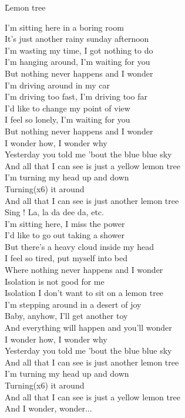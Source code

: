 \documentclass{novel}
\begin{document}
\newpage
\small
\h*{Lemon tree}

I'm sitting here in a boring room \\
It's just another rainy sunday afternoon \\
I'm wasting my time, I got nothing to do \\
I'm hanging around, I'm waiting for you \\
But nothing never happens and I wonder \\
I'm driving around in my car \\
I'm driving too fast, I'm driving too far \\
I'd like to change my point of view \\
I feel so lonely, I'm waiting for you \\
But nothing never happens and I wonder \\

I wonder how, I wonder why \\
Yesterday you told me 'bout the blue blue sky \\
And all that I can see is just a yellow lemon tree \\
I'm turning my head up and down \\
Turning(x6) it around \\
And all that I can see is just another lemon tree \\
Sing ! La, la da dee da, etc. \\

I'm sitting here, I miss the power \\
I'd like to go out taking a shower \\
But there's a heavy cloud inside my head \\
I feel so tired, put myself into bed \\
Where nothing never happens and I wonder \\

Isolation is not good for me \\
Isolation I don't want to sit on a lemon tree \\
I'm stepping around in a desert of joy \\
Baby, anyhow, I'll get another toy \\
And everything will happen and you'll wonder \\

I wonder how, I wonder why \\
Yesterday you told me 'bout the blue blue sky \\
And all that I can see is just another lemon tree \\
I'm turning my head up and down \\
Turning(x6) it around \\
And all that I can see is just a yellow lemon tree \\
And I wonder, wonder... \\
\end{document}
